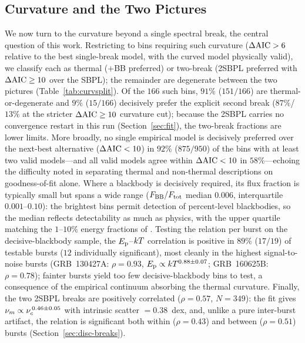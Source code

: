 \subsection{Curvature and the Two Pictures} \label{sec:curv}
We now turn to the curvature beyond a single spectral break, the central question
of this work. Restricting to bins requiring such curvature ($\Delta\mathrm{AIC}>6$ relative to
the best single-break model, with the curved model physically valid), we classify
each as thermal ($+$BB preferred) or two-break (2SBPL preferred with
$\Delta\mathrm{AIC}\ge10$ over the SBPL); the remainder are degenerate between the two
pictures (Table~\ref{tab:curvsplit}). Of the $166$ such bins, $91\%$
($151/166$) are thermal-or-degenerate and $9\%$ ($15/166$) decisively prefer
the explicit second break ($87\%$/$13\%$ at the stricter $\Delta\mathrm{AIC}\ge10$
curvature cut); because the 2SBPL carries no convergence restart in this run
(Section~\ref{sec:fit}), the two-break fractions are lower limits. More
broadly, no single empirical model is decisively preferred over the next-best
alternative ($\Delta\mathrm{AIC}<10$) in $92\%$ ($875/950$) of the bins with at least two
valid models---and all valid models agree within $\Delta\mathrm{AIC}<10$ in $58\%$---echoing
the difficulty \citet{Basak2014} noted in separating thermal and non-thermal
descriptions on goodness-of-fit alone. Where a blackbody is decisively
required, its flux fraction is typically small but spans a wide range
($F_{\rm BB}/F_{\rm tot}$ median $0.006$, interquartile $0.001$--$0.10$): the
brightest bins permit detection of percent-level blackbodies, so the median
reflects detectability as much as physics, with the upper quartile matching the
$1$--$10\%$ energy fractions of \citet{Guiriec2015}. Testing the
\citet{Burgess2014a} relation per burst on the decisive-blackbody sample, the
$E_{\rm p}$--$kT$ correlation is positive in $89\%$ ($17/19$) of testable bursts
($12$ individually significant), most cleanly in the highest signal-to-noise
bursts (GRB~130427A: $\rho=0.93$, $E_{\rm p}\propto kT^{0.88\pm0.07}$;
GRB~160625B: $\rho=0.78$); fainter bursts yield too few decisive-blackbody bins
to test, a consequence of the empirical continuum absorbing the thermal
curvature. Finally, the two 2SBPL breaks are positively correlated
($\rho=0.57$, $N=349$): the \citet{DAgostini2005} fit gives
$\nu_m\propto\nu_c^{\,0.46\pm0.05}$ with intrinsic scatter \ssc$=0.38$~dex, and,
unlike a pure inter-burst artifact, the relation is significant both within
($\rho=0.43$) and between ($\rho=0.51$) bursts (Section~\ref{sec:disc-breaks}).

